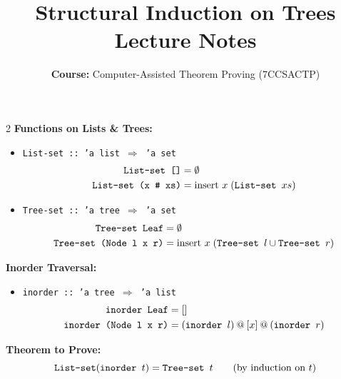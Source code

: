\documentclass[10pt,a4paper]{article}
\title{\textbf{\huge Structural Induction on Trees}\\[0.3em]
\large Lecture Notes}
\author{\textbf{Course:} Computer-Assisted Theorem Proving (7CCSACTP)}
\date{}
\begin{document}
\maketitle
\vspace{-1.5em}

\begin{tcolorbox}[title={1. Definitions \& Recalled Concepts}]
\begin{multicols}{2}
\textbf{Functions on Lists \& Trees:}
\begin{itemize}[leftmargin=1.2em, itemsep=2pt]
    \item \texttt{List-set :: 'a list $\Rightarrow$ 'a set}
    \begin{align*}
    \text{\texttt{List-set []}} &= \emptyset \\
    \text{\texttt{List-set (x \# xs)}} &= \text{insert } x \; (\text{\texttt{List-set }} xs)
    \end{align*}
    \item \texttt{Tree-set :: 'a tree $\Rightarrow$ 'a set}
    \begin{align*}
    \text{\texttt{Tree-set Leaf}} &= \emptyset \\
    \text{\texttt{Tree-set (Node l x r)}} &= \text{insert } x \; (\text{\texttt{Tree-set }} l \cup \text{\texttt{Tree-set }} r)
    \end{align*}
\end{itemize}

\columnbreak

\textbf{Inorder Traversal:}
\begin{itemize}[leftmargin=1.2em, itemsep=2pt]
    \item \texttt{inorder :: 'a tree $\Rightarrow$ 'a list}
    \begin{align*}
    \text{\texttt{inorder Leaf}} &= [] \\
    \text{\texttt{inorder (Node l x r)}} &= (\text{\texttt{inorder }} l) \mathbin{@} [x] \mathbin{@} (\text{\texttt{inorder }} r)
    \end{align*}
\end{itemize}
\textbf{Theorem to Prove:}
\[ \text{\texttt{List-set}}(\text{\texttt{inorder }} t) = \text{\texttt{Tree-set }} t \qquad (\text{by induction on } t) \]
\end{multicols}
\end{tcolorbox}

\vspace{0.3em}
\end{document}
